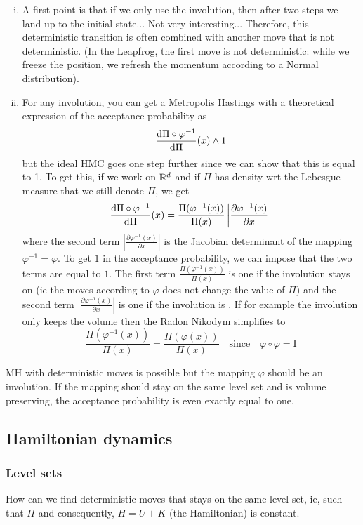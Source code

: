 \documentclass[english,graybox,envcountchap,envcountsame,sectrefs,shortlabels]{svmono}
\theoremstyle{style}
\newcommand{\Id}{\mathrm{I}}
\newcommand{\lrav}[1]{\left|#1 \right|}
\begin{document}
\begin{remark}
\begin{enumerate}[(i)]
\item A first point is that if we only use the involution, then after two steps we land up to the initial state... Not very interesting... Therefore, this deterministic transition is often combined with another move that is not deterministic. (In the Leapfrog, the first move is not deterministic: while we freeze the position, we refresh the momentum according to a Normal distribution).
\item For any involution, you can get a Metropolis Hastings with a theoretical expression of the acceptance probability as
$$
\frac{\mathrm{d} \Pi\circ \varphi^{-1}}{\mathrm{d} \Pi}(x)  \wedge 1
$$
but the ideal HMC goes one step further since we can show that this is equal to 1. To get this, if we work on $\mathbb{R}^d$ and if $\Pi$ has density wrt the Lebesgue measure that we still denote $\Pi$, we get
$$
\frac{\rmd \Pi\circ \varphi^{-1}}{\rmd \Pi}(x)=\frac{\Pi(\varphi^{-1}(x))}{\Pi(x)} \lrav{\frac{\partial \varphi^{-1}(x)}{\partial x}}
$$
where the second term $\lrav{\frac{\partial \varphi^{-1}(x)}{\partial x}}$ is the Jacobian determinant of the mapping  $\varphi^{-1}=\varphi$. To get $1$ in the acceptance probability, we can impose that the two terms are equal to $1$. The first term $\frac{\Pi(\varphi^{-1}(x))}{\Pi(x)}$ is one if the involution stays on  (ie the moves according to $\varphi$ does not change the value of $\Pi$) and the second term $\lrav{\frac{\partial \varphi^{-1}(x)}{\partial x}}$ is one if the involution is . If for example the involution only keeps the volume then the Radon Nikodym simplifies to
$$
\frac{\Pi(\varphi^{-1}(x))}{\Pi(x)} =\frac{\Pi(\varphi(x))}{\Pi(x)}  \quad \mbox{since} \quad \varphi \circ \varphi=\Id
$$
\end{enumerate}
  
\end{remark}

MH with deterministic moves is possible but the mapping $\varphi$ should be an involution. If the mapping should stay on the same level set and is volume preserving, the acceptance probability is even exactly equal to one.
\subsection{Hamiltonian dynamics}
\subsubsection{Level sets}
How can we find deterministic moves that stays on the same level set, ie, such that $\Pi$ and consequently, $H=U+K$ (the Hamiltonian) is constant.
\end{document}

